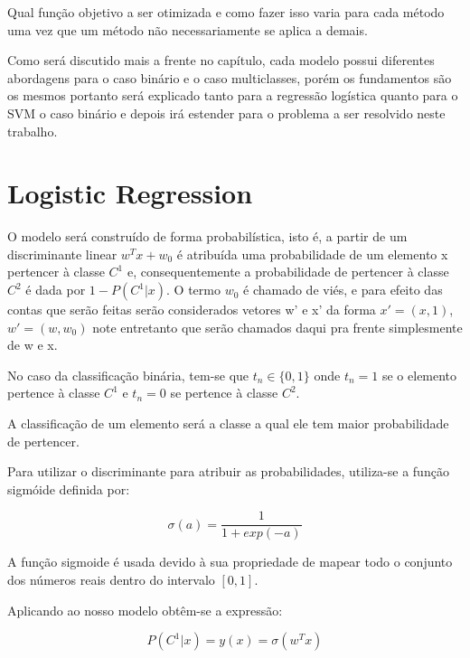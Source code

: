 Qual função objetivo a ser otimizada e como fazer isso varia para cada método uma vez que
um método não necessariamente se aplica a demais.

Como será discutido mais a frente no capítulo, cada modelo possui diferentes abordagens para o
caso binário e o caso multiclasses, porém os fundamentos são os mesmos portanto será explicado
tanto para a regressão logística quanto para o SVM o caso binário e depois irá estender para
o problema a ser resolvido neste trabalho.


\section{Logistic Regression}
\label{sec:logreg} 

O modelo será construído de forma probabilística, isto é, a partir de um 
discriminante linear $w^Tx + w_0$ é atribuída uma probabilidade de um elemento x
pertencer à classe $C^1$ e, consequentemente a probabilidade de pertencer à classe
$C^2$ é dada por $1 - P(C^1 | x)$. O termo $w_0$ é chamado de viés, e para efeito
das contas que serão feitas serão considerados vetores w' e x' da forma $x' = (x, 1)$,
$w'= (w, w_0)$ note entretanto que serão chamados daqui pra frente simplesmente de w e x.

No caso da classificação binária, tem-se que $t_n \in \{0, 1\}$ onde $t_n = 1$ se o
elemento pertence à classe $C^1$ e $t_n = 0$ se pertence à classe $C^2$.

A classificação de um elemento será a classe a qual ele tem maior probabilidade de pertencer.

Para utilizar o discriminante para atribuir as probabilidades, utiliza-se a função
sigmóide definida por:

\begin{center}
	\begin{equation}
		\sigma(a) = \frac{1}{1 + exp(-a)}
	\end{equation}
\end{center}

A função sigmoide é usada devido à sua propriedade de mapear
todo o conjunto dos números reais dentro do intervalo $[0, 1]$.

Aplicando ao nosso modelo obtêm-se a expressão:

\begin{center}
	\begin{equation}
		P(C^1 | x) = y(x) = \sigma(w^Tx)
	\end{equation}
\end{center}

